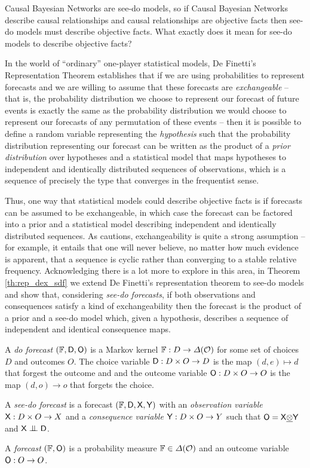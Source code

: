 Causal Bayesian Networks are see-do models, so if Causal Bayesian Networks describe causal relationships and causal relationships are objective facts then see-do models must describe objective facts. What exactly does it mean for see-do models to describe objective facts?

In the world of ``ordinary'' one-player statistical models, De Finetti's Representation Theorem establishes that if we are using probabilities to represent forecasts and we are willing to assume that these forecasts are \emph{exchangeable} -- that is, the probability distribution we choose to represent our forecast of future events is exactly the same as the probability distribution we would choose to represent our forecasts of any permutation of these events -- then it is possible to define a random variable representing the \emph{hypothesis} such that the probability distribution representing our forecast can be written as the product of a \emph{prior distribution} over hypotheses and a statistical model that maps hypotheses to independent and identically distributed sequences of observations, which is a sequence of precisely the type that converges in the frequentist sense.

Thus, one way that statistical models could describe objective facts is if forecasts can be assumed to be exchangeable, in which case the forecast can be factored into a prior and a statistical model describing  independent and identically distributed sequences. As \citet{walley_statistical_1991} cautions, exchangeability is quite a strong assumption -- for example, it entails that one will never believe, no matter how much evidence is apparent, that a sequence is cyclic rather than converging to a stable relative frequency. Acknowledging there is a lot more to explore in this area, in Theorem \ref{th:rep_dex_sdf} we extend De Finetti's representation theorem to see-do models and show that, considering \emph{see-do forecasts}, if both observations and consequences satisfy a kind of exchangeability then the forecast is the product of a prior and a see-do model which, given a hypothesis, describes a sequence of independent and identical consequence maps.

\begin{definition}\label{def:do_forecast}
A \emph{do forecast} $(\mathbb{F},\mathsf{D},\mathsf{O})$ is a Markov kernel $\mathbb{F}:D\to \Delta(\mathcal{O})$ for some set of choices $D$ and outcomes $O$. The choice variable $\mathsf{D}:D\times O\to D$ is the map $(d,e)\mapsto d$ that forgest the outcome and and the outcome variable $\mathsf{O}:D\times O\to O$ is the map $(d,o)\to o$ that forgets the choice.

A \emph{see-do forecast} is a forecast $(\mathbb{F},\mathsf{D},\mathsf{X},\mathsf{Y})$ with an \emph{observation variable} $\mathsf{X}:D\times O\to X$ and a \emph{consequence variable} $\mathsf{Y}:D\times O\to Y$ such that $\mathsf{O}=\mathsf{X}\underline{\otimes}\mathsf{Y}$ and $\RV{X}\CI\RV{D}$.

A \emph{forecast} $(\mathbb{F},\mathsf{O})$ is a probability measure $\mathbb{F}\in\Delta(\mathcal{O})$ and an outcome variable $\mathsf{O}:O\to O$.
\end{definition}


